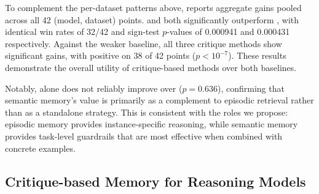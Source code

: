 To complement the per-dataset patterns above,  reports aggregate gains pooled across all 42 (model, dataset) points. \EPCRIT{} and \EPSEMCRIT{} both significantly outperform \EPLABEL{}, with identical win rates of 32/42 and sign-test $p$-values of 0.000941 and 0.000431 respectively. Against the weaker \ZEROSHOT{} baseline, all three critique methods show significant gains, with \EPSEMCRIT{} positive on 38 of 42 points ($p < 10^{-7}$). These results demonstrate the overall utility of critique-based methods over both baselines.

Notably, \SEMCRIT{} alone does not reliably improve over \EPLABEL{} ($p=0.636$), confirming that semantic memory's value is primarily as a complement to episodic retrieval rather than as a standalone strategy. This is consistent with the roles we propose: episodic memory provides instance-specific reasoning, while semantic memory provides task-level guardrails that are most effective when combined with concrete examples.

\subsection{Critique-based Memory for Reasoning Models}
\label{sec:token_analysis}


